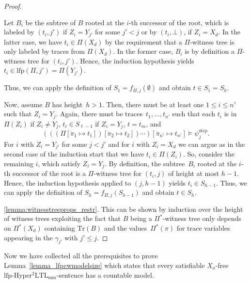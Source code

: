 \documentclass[dvipsnames,10pt,a4paper]{amsart}
\theoremstyle{definition}
\theoremstyle{remark}
\newcommand{\lfpsohyltlfp}{\mathrm{lfp\text{-}{Hyper^2LTL_{\mathrm{mm}}}}\xspace}
\newcommand{\univar}{X_a}
\newcommand{\unidisvar}{X_d}
\newcommand{\traces}{\mathrm{Tr}}
\newcommand{\step}{\mathrm{step}}
\newcommand{\overdotdot}[1]{\ddot{#1}}
\newcommand{\lfp}{\mathrm{lfp}}
\newcommand{\tree}{B}
\begin{document}
\begin{proof}
\begin{itemize}
    Let $\tree_i$ be the subtree of $\tree$ rooted at the $i$-th successor of the root, which is labeled by $(t_i,j')$ if $Z_i = Y_{j'}$ for some $j' < j$ or by $(t_i, \bot)$, if $Z_i = \unidisvar$.
    In the latter case, we have $t_i \in \Pi(\unidisvar)$ by the requirement that a $\Pi$-witness tree is only labeled by traces from $\Pi(\unidisvar)$.
    In the former case, $\tree_i$ is by definition a $\Pi$-witness tree for $(t_i,j')$.
    Hence, the induction hypothesis yields $t_i \in \lfp(\Pi, j') = \Pi(Y_{j'})$.

    Thus, we can apply the definition of $S_1 = f_{\Pi,j}(\emptyset)$ and obtain $t \in S_1 = S_h$.
\end{itemize}

Now, assume $\tree$ has height~$h > 1$. Then, there must be at least one $1 \le i \le n'$ such that 
$Z_i = Y_j$. Again, there must be traces~$t_1, \ldots, t_{n'}$ such that each $t_i$ is in $\Pi(Z_i)$ if $Z_i \neq Y_j$, $t_i \in S_{\ell-1}$ if $Z_i = Y_j$, $t = t_m$, and 
    \[    (((\Pi[\overdotdot{\pi}_1 \mapsto t_1])[\overdotdot{\pi}_2 \mapsto t_2]) \cdots )[\overdotdot{\pi}_{n'} \mapsto t_{n'}]
    \models \psi_j^\step.\]
For $i$ with $Z_i = Y_{j'}$ for some $j < j'$ and for $i$ with $Z_i = \unidisvar$ we can argue as in the second case of the induction start that we have $t_i \in \Pi(Z_i)$.
So, consider the remaining $i$, which satisfy $Z_i = Y_j$. 
By definition, the subtree~$\tree_i$ rooted at the $i$-th successor of the root is a $\Pi$-witness tree for $(t_i,j)$ of height at most $h-1$. 
Hence, the induction hypothesis applied to $(j,h-1)$ yields $t_i \in S_{h-1}$. 
    Thus, we can apply the definition of $S_h = f_{\Pi,j}(S_{h-1})$ and obtain $t \in S_h$.

\ref{lemma:witnesstreeprops_restr}.
This can be shown by induction over the height of witness trees exploiting the fact that $\tree$ being a $\Pi^*$-witness tree only depends on $\Pi^*(\unidisvar)$ containing $\traces(\tree)$ and the values~$\Pi^*(\pi)$ for trace variables appearing in the $\gamma_{j'}$ with $j' \le j$.
\end{proof}

Now we have collected all the prerequisites to prove Lemma~\ref{lemma_lfpcwmodelsize} which states that every satisfiable $\univar$-free $\lfpsohyltlfp$-sentence has a countable model.
\end{document}
